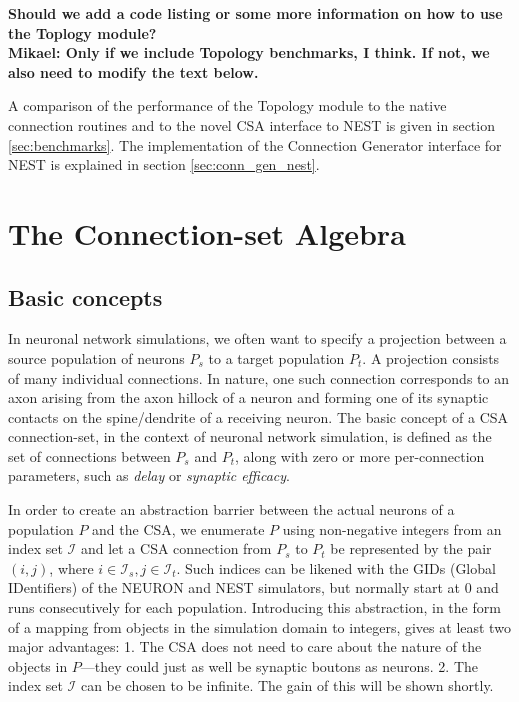\documentclass{frontiersSCNS} %
\newcommand{\tbw}[1]{{\bf\parindent0pt\color{red}#1}}
\begin{document}
\tbw{Should we add a code listing or some more information on how to
  use the Toplogy module?\\
Mikael: Only if we include Topology benchmarks, I think. If not, we
also need to modify the text below.}

A comparison of the performance of the Topology module to the native
connection routines and to the novel CSA interface to NEST is given in
section \ref{sec:benchmarks}. The implementation of the Connection
Generator interface for NEST is explained in section
\ref{sec:conn_gen_nest}.


\section{The Connection-set Algebra}\label{sec:csa}

\subsection{Basic concepts}

In neuronal network simulations, we often want to specify a projection
between a source population of neurons $P_s$ to a target population
$P_t$.  A projection consists of many individual connections.  In
nature, one such connection corresponds to an axon arising from the
axon hillock of a neuron and forming one of its synaptic contacts on
the spine/dendrite of a receiving neuron.  The basic concept of a CSA
connection-set, in the context of neuronal network simulation, is
defined as the set of connections between $P_s$ and $P_t$, along with
zero or more per-connection parameters, such as \emph{delay} or
\emph{synaptic efficacy}.

In order to create an abstraction barrier between the actual neurons
of a population $P$ and the CSA, we enumerate $P$ using non-negative
integers from an index set $\mathcal{I}$ and let a CSA connection from
$P_s$ to $P_t$ be represented by the pair $(i, j)$, where $i \in
\mathcal{I}_s, j \in \mathcal{I}_t$.  Such indices can be likened with
the GIDs (Global IDentifiers) of the NEURON and NEST simulators, but
normally start at 0 and runs consecutively for each population.
Introducing this abstraction, in the form of a mapping from objects in
the simulation domain to integers, gives at least two major
advantages: 1. The CSA does not need to care about the nature of the
objects in $P$---they could just as well be synaptic boutons as neurons.
2. The index set $\mathcal{I}$ can be chosen to be infinite.  The
gain of this will be shown shortly.
\end{document}
